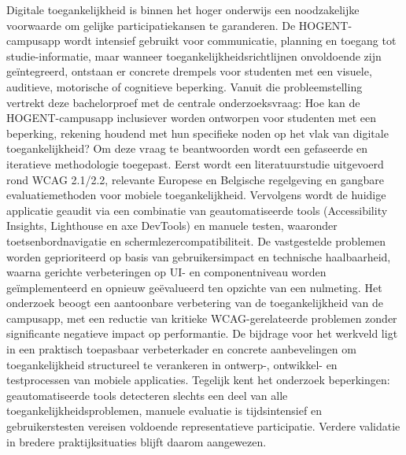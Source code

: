 Digitale toegankelijkheid is binnen het hoger onderwijs een noodzakelijke voorwaarde om gelijke participatiekansen te garanderen. De HOGENT-campusapp wordt intensief gebruikt voor communicatie, planning en toegang tot studie-informatie, maar wanneer toegankelijkheidsrichtlijnen onvoldoende zijn geïntegreerd, ontstaan er concrete drempels voor studenten met een visuele, auditieve, motorische of cognitieve beperking. Vanuit die probleemstelling vertrekt deze bachelorproef met de centrale onderzoeksvraag: Hoe kan de HOGENT-campusapp inclusiever worden ontworpen voor studenten met een beperking, rekening houdend met hun specifieke noden op het vlak van digitale toegankelijkheid? Om deze vraag te beantwoorden wordt een gefaseerde en iteratieve methodologie toegepast. Eerst wordt een literatuurstudie uitgevoerd rond WCAG 2.1/2.2, relevante Europese en Belgische regelgeving en gangbare evaluatiemethoden voor mobiele toegankelijkheid. Vervolgens wordt de huidige applicatie geaudit via een combinatie van geautomatiseerde tools (Accessibility Insights, Lighthouse en axe DevTools) en manuele testen, waaronder toetsenbordnavigatie en schermlezercompatibiliteit. De vastgestelde problemen worden geprioriteerd op basis van gebruikersimpact en technische haalbaarheid, waarna gerichte verbeteringen op UI- en componentniveau worden geïmplementeerd en opnieuw geëvalueerd ten opzichte van een nulmeting. Het onderzoek beoogt een aantoonbare verbetering van de toegankelijkheid van de campusapp, met een reductie van kritieke WCAG-gerelateerde problemen zonder significante negatieve impact op performantie. De bijdrage voor het werkveld ligt in een praktisch toepasbaar verbeterkader en concrete aanbevelingen om toegankelijkheid structureel te verankeren in ontwerp-, ontwikkel- en testprocessen van mobiele applicaties. Tegelijk kent het onderzoek beperkingen: geautomatiseerde tools detecteren slechts een deel van alle toegankelijkheidsproblemen, manuele evaluatie is tijdsintensief en gebruikerstesten vereisen voldoende representatieve participatie. Verdere validatie in bredere praktijksituaties blijft daarom aangewezen.


